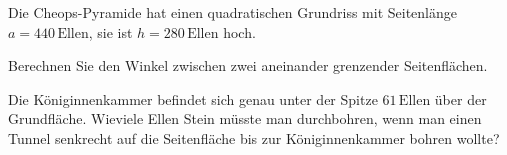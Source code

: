 Die Cheops-Pyramide hat einen quadratischen Grundriss mit Seitenlänge
$a=440\,\text{Ellen}$, sie ist $h=280\,\text{Ellen}$ hoch.
\begin{center}
\end{center}
\begin{teilaufgaben}
\item
Berechnen Sie den Winkel zwischen zwei aneinander grenzender Seitenflächen.
\item
Die Königinnenkammer befindet sich genau unter der Spitze $61\,\text{Ellen}$
über der Grundfläche. Wieviele Ellen Stein müsste man durchbohren, wenn
man einen Tunnel senkrecht auf die Seitenfläche bis zur Königinnenkammer
bohren wollte?
\end{teilaufgaben}


